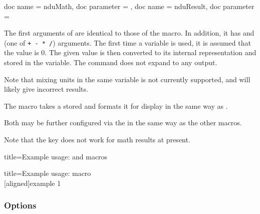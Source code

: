 \documentclass{article}
\begin{document}
\begin{docCommands}[]{
	{
		doc name = nduMath,
		doc parameter = 
	},
	{
		doc name = nduResult,
		doc parameter = 
	}
}

The first arguments of  are identical to those of the  macro. In addition, it has  and  (one of \texttt{+ - * /}) arguments. The first time a variable is used, it is assumed that the value is 0. The given value is then converted to its internal representation and stored in the variable. The command does not expand to any output.

Note that mixing units in the same variable is not currently supported, and will likely give incorrect results.

The  macro takes a stored  and formats it for display in the same way as .

Both may be further configured via the  in the same way as the other macros.

Note that the  key does not work for math results at present. %

\begin{dispExample*}{
	title=Example usage:  and  macros
}
\end{dispExample*}

\begin{dispExample*}{
	title=Example usage:  macro
}
\\
[aligned]{example 1}
\end{dispExample*}
\end{docCommands}

\clearpage
\subsubsection{Options}
\end{document}
